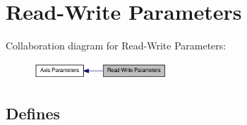 \hypertarget{group__RWParam}{
\section{Read-\/Write Parameters}
\label{group__RWParam}
}


Collaboration diagram for Read-\/Write Parameters:\nopagebreak
\begin{figure}[H]
\begin{center}
\leavevmode
\includegraphics[width=142pt]{group__RWParam}
\end{center}
\end{figure}
\subsection*{Defines}
